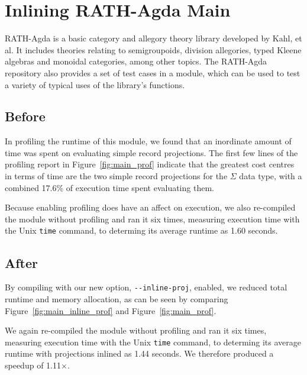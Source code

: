 \section{Inlining RATH-Agda Main}
\label{sec:app_one}

RATH-Agda is a basic category and allegory theory library developed by Kahl, et al.\cite{kahl2017} It includes theories relating to semigroupoids, division allegories, typed Kleene algebras and monoidal categories, among other topics.\cite{kahl2017} The RATH-Agda repository also provides a set of test cases in a  module, which can be used to test a variety of typical uses of the library's functions.

\subsection{Before}



In profiling the runtime of this  module, we found that an inordinate amount of time was spent on evaluating simple record projections. The first few lines of the profiling report in Figure~\ref{fig:main_prof} indicate that the greatest cost centres in terms of time are the two simple record projections for the $\Sigma$ data type, with a combined 17.6\% of execution time spent evaluating them.

Because enabling profiling does have an affect on execution, we also re-compiled the module without profiling and ran it six times, measuring execution time with the Unix \texttt{time} command, to determing its average runtime as 1.60 seconds.

\subsection{After}



By compiling  with our new option, \texttt{-{}-inline-proj}, enabled, we reduced total runtime and memory allocation, as can be seen by comparing Figure~\ref{fig:main_inline_prof} and Figure~\ref{fig:main_prof}.

We again re-compiled the module without profiling and ran it six times, measuring execution time with the Unix \texttt{time} command, to determing its average runtime with projections inlined as 1.44 seconds. We therefore produced a speedup of 1.11$\times$.

